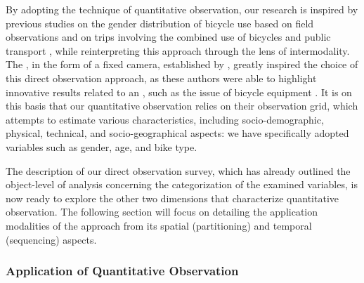 \begin{refsegment}
By adopting the technique of quantitative observation, our research is inspired by previous studies on the gender distribution of bicycle use based on field observations \textcolor{blue}{\autocite[]{raibaud_femmes_2020}} and on trips involving the combined use of bicycles and public transport \textcolor{blue}{\autocites[192]{sherwin_practices_2011}[27]{la_paix_puello_modelling_2015}}, while reinterpreting this approach through the lens of intermodality. The , in the form of a fixed camera, established by \textcolor{blue}{\textcite[99]{cochoy_mort_2013}}, greatly inspired the choice of this direct observation approach, as these authors were able to highlight innovative results related to an , such as the issue of bicycle equipment \textcolor{blue}{\autocite[8]{cochoy_bicycles_2019}}. It is on this basis that our quantitative observation relies on their observation grid, which attempts to estimate various characteristics, including socio-demographic, physical, technical, and socio-geographical aspects: we have specifically adopted variables such as gender, age, and bike type.%

The description of our direct observation survey, which has already outlined the object-level of analysis concerning the categorization of the examined variables, is now ready to explore the other two dimensions that characterize quantitative observation. The following section will focus on detailing the application modalities of the approach from its spatial (partitioning) and temporal (sequencing) aspects.%

\subsubsection*{Application of Quantitative Observation
    \label{chap3:application-observation-quantitative}
    }


\end{refsegment}
